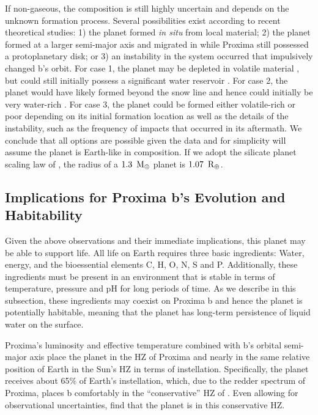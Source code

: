 \documentclass[preprint,12pt]{aastex}
\def\mearth{{\rm\,M_\oplus}}
\def\rearth{{\rm\,R_\oplus}}
\begin{document}
If non-gaseous, the composition is still highly uncertain and depends
on the unknown formation process. Several possibilities exist
according to recent theoretical studies: 1) the planet formed {\it in
  situ} from local material; 2) the planet formed at a larger
semi-major axis and migrated in while Proxima still possessed a
protoplanetary disk; or 3) an instability in the system occurred that
impulsively changed b's orbit. For case 1, the planet may be depleted
in volatile material \citep{Raymond07,Lissauer07}, but could still
initially possess a significant water reservoir \citep{Ciesla15,Mulders15}. For case 2,
the planet would have likely formed beyond the snow line and hence
could initially be very water-rich \citep{CarterBond12}. For case 3, the planet
could be formed either volatile-rich or poor depending on its initial
formation location as well as the details of the instability, such as
the frequency of impacts that occurred in its aftermath. We conclude
that all options are possible given the data and for simplicity will
assume the planet is Earth-like in composition. If we adopt the
silicate planet scaling law of \cite{Sotin07}, the radius of a
$1.3~\mearth$ planet is $1.07~\rearth$.

\subsection{Implications for Proxima b's Evolution and Habitability}
\label{sec:obs:imp}

Given the above observations and their immediate implications, this
planet may be able to support life. All life on Earth requires three
basic ingredients: Water, energy, and the bioessential elements C, H,
O, N, S and P. Additionally, these ingredients must be present in an
environment that is stable in terms of temperature, pressure and pH
for long periods of time. As we describe in this subsection, these
ingredients may coexist on Proxima b and hence the planet is
potentially habitable, meaning that the planet has long-term persistence
of liquid water on the surface.

Proxima's luminosity and effective temperature combined with b's
orbital semi-major axis place the planet in the HZ of
Proxima and nearly in the same relative position of Earth in the Sun's
HZ in terms of instellation. Specifically, the planet receives about 65\% of Earth's
instellation, which, due to the redder spectrum of Proxima, places b comfortably in the ``conservative'' HZ of 
\cite{Kopparapu13}. Even allowing for observational uncertainties, 
\cite{AngladaEscude16} find that the planet is in this
conservative HZ. 
\end{document}
